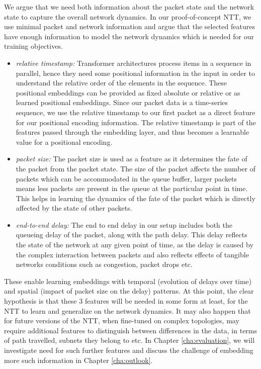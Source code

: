 We argue that we need both information about the packet state and the network state to capture the overall network dynamics. In our proof-of-concept NTT, we use minimal packet and network
information and argue that the selected features have enough information to model the network dynamics which is needed for our training objectives.
\begin{itemize}
\item \emph{relative timestamp:} Transformer architectures process items in a sequence in parallel, hence they need some positional information in the input in order to understand the relative order of the elements in the sequence. These positional embeddings can be provided as fixed absolute\cite{vaswaniAttentionAllYou2017} or relative\cite{shaw2018selfattention} or as learned positional embeddings\cite{gehring2017convolutional}. Since our packet data is a time-series sequence, we use the relative timestamp to our first packet as a direct feature for our positional encoding information. The relative timestamp is part of the features passed through the embedding layer, and thus becomes a learnable value for a positional encoding.
\item \emph{packet size:} The packet size is used as a feature as it determines the fate of the packet from the packet state. The size of the packet affects the number of packets which can be accommodated in the queue buffer, \eg larger packets means less packets are present in the queue at the particular point in time. This helps in learning the dynamics of the fate of the packet which is directly affected by the state of other packets.
\item \emph{end-to-end delay:} The end to end delay in our setup includes both the queueing delay of the packet, along with the path delay. This delay reflects the state of the network at any given point of time, as the delay is caused by the complex interaction between packets and also reflects effects of tangible networks conditions such as congestion, packet drops etc.
\end{itemize}

These enable learning embeddings with temporal (evolution of delays over time) and spatial (impact of packet size on the delay) patterns. At this point, the clear hypothesis is that these $3$ features will be needed in some form at least, for the NTT to learn and generalize on the network dynamics. It may also happen that for future versions of the NTT, when fine-tuned on complex topologies, may require additional features to distinguish between differences in the data, in terms of path travelled, subnets they belong to etc. In Chapter \ref{cha:evaluation}, we will investigate need for such further features and discuss the challenge of embedding more such information in Chapter \ref{cha:outlook}. 

